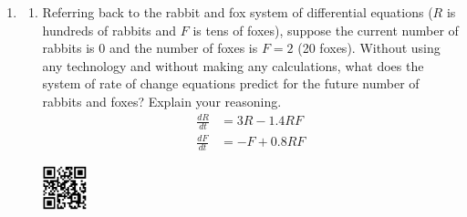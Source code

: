 \begin{enumerate}
	


\item
\begin{enumerate}
\item Referring back to the rabbit and fox system of differential equations ($R$ is hundreds of rabbits and $F$ is tens of foxes), suppose the current number of rabbits is 0 and the number of foxes is $F=2$ (20 foxes). Without using any technology and without making any calculations, what does the system of rate of change equations predict for the future number of rabbits and foxes? Explain your reasoning. \label{09HWproblem3parta}
	\begin{align*}
	\frac{dR}{dt} &= 3R-1.4RF\\
	\frac{dF}{dt} &= -F+0.8RF
\end{align*}

\vspace{-0.75in}\hspace{-0.7in}\includegraphics[width=0.5in]{11/11DEExplorerQR.png}


\end{enumerate}
\end{enumerate}
